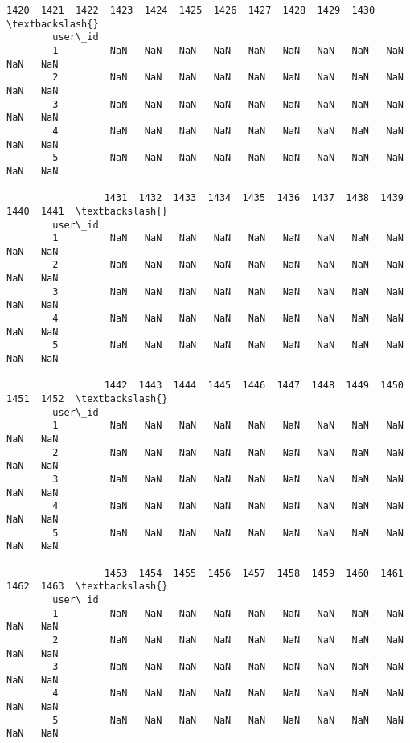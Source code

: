 \documentclass[11pt]{article}
\begin{document}
\begin{Verbatim}[commandchars=\\\{\}]
                 1420  1421  1422  1423  1424  1425  1426  1427  1428  1429  1430  \textbackslash{}
        user\_id                                                                     
        1         NaN   NaN   NaN   NaN   NaN   NaN   NaN   NaN   NaN   NaN   NaN   
        2         NaN   NaN   NaN   NaN   NaN   NaN   NaN   NaN   NaN   NaN   NaN   
        3         NaN   NaN   NaN   NaN   NaN   NaN   NaN   NaN   NaN   NaN   NaN   
        4         NaN   NaN   NaN   NaN   NaN   NaN   NaN   NaN   NaN   NaN   NaN   
        5         NaN   NaN   NaN   NaN   NaN   NaN   NaN   NaN   NaN   NaN   NaN   
        
                 1431  1432  1433  1434  1435  1436  1437  1438  1439  1440  1441  \textbackslash{}
        user\_id                                                                     
        1         NaN   NaN   NaN   NaN   NaN   NaN   NaN   NaN   NaN   NaN   NaN   
        2         NaN   NaN   NaN   NaN   NaN   NaN   NaN   NaN   NaN   NaN   NaN   
        3         NaN   NaN   NaN   NaN   NaN   NaN   NaN   NaN   NaN   NaN   NaN   
        4         NaN   NaN   NaN   NaN   NaN   NaN   NaN   NaN   NaN   NaN   NaN   
        5         NaN   NaN   NaN   NaN   NaN   NaN   NaN   NaN   NaN   NaN   NaN   
        
                 1442  1443  1444  1445  1446  1447  1448  1449  1450  1451  1452  \textbackslash{}
        user\_id                                                                     
        1         NaN   NaN   NaN   NaN   NaN   NaN   NaN   NaN   NaN   NaN   NaN   
        2         NaN   NaN   NaN   NaN   NaN   NaN   NaN   NaN   NaN   NaN   NaN   
        3         NaN   NaN   NaN   NaN   NaN   NaN   NaN   NaN   NaN   NaN   NaN   
        4         NaN   NaN   NaN   NaN   NaN   NaN   NaN   NaN   NaN   NaN   NaN   
        5         NaN   NaN   NaN   NaN   NaN   NaN   NaN   NaN   NaN   NaN   NaN   
        
                 1453  1454  1455  1456  1457  1458  1459  1460  1461  1462  1463  \textbackslash{}
        user\_id                                                                     
        1         NaN   NaN   NaN   NaN   NaN   NaN   NaN   NaN   NaN   NaN   NaN   
        2         NaN   NaN   NaN   NaN   NaN   NaN   NaN   NaN   NaN   NaN   NaN   
        3         NaN   NaN   NaN   NaN   NaN   NaN   NaN   NaN   NaN   NaN   NaN   
        4         NaN   NaN   NaN   NaN   NaN   NaN   NaN   NaN   NaN   NaN   NaN   
        5         NaN   NaN   NaN   NaN   NaN   NaN   NaN   NaN   NaN   NaN   NaN   
        

\end{Verbatim}
\end{document}
